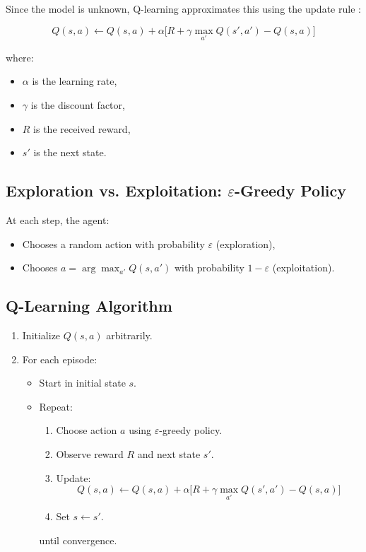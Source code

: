 \documentclass[10pt,twocolumn,letterpaper]{article}
\begin{document}
Since the model is unknown, Q-learning approximates this using the update rule \cite{lecture10}:

\begin{adjustwidth}{-0.5cm}{0cm}
    $$
    Q(s, a) \leftarrow Q(s, a) + \alpha \big[ R + \gamma \max_{a'} Q(s', a') - Q(s, a) \big]
    $$
\end{adjustwidth}


\noindent where:
\begin{itemize}
    \item \( \alpha \) is the learning rate,
    \item \( \gamma \) is the discount factor,
    \item \( R \) is the received reward,
    \item \( s' \) is the next state.
\end{itemize}

\subsection*{Exploration vs. Exploitation: \(\varepsilon\)-Greedy Policy}

At each step, the agent:
\begin{itemize}
    \item Chooses a random action with probability \( \varepsilon \) (exploration),
    \item Chooses \( a = \arg\max_{a'} Q(s, a') \) with probability \( 1 - \varepsilon \) (exploitation).
\end{itemize}

\subsection*{Q-Learning Algorithm}

\begin{enumerate}
    \item Initialize \( Q(s, a) \) arbitrarily.
    \item For each episode:
    \begin{itemize}
        \item Start in initial state \( s \).
        \item Repeat:
        \begin{enumerate}
            \item Choose action \( a \) using \(\varepsilon\)-greedy policy.
            \item Observe reward \( R \) and next state \( s' \).
            \item Update:
            \[
            Q(s, a) \leftarrow Q(s, a) + \alpha \big[ R + \gamma \max_{a'} Q(s', a') - Q(s, a) \big]
            \]
            \item Set \( s \leftarrow s' \).
        \end{enumerate}
        until convergence.
    \end{itemize}
\end{enumerate}
\end{document}
